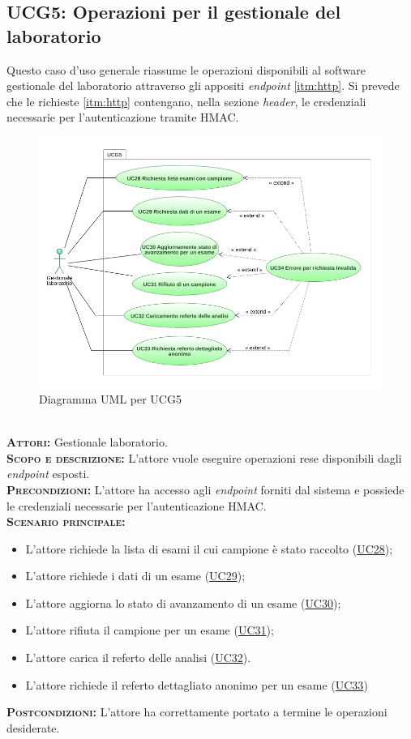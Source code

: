 \subsection{UCG5: Operazioni per il gestionale del laboratorio}
\label{sec:UCG5}
Questo caso d'uso generale riassume le operazioni disponibili al software gestionale del laboratorio attraverso gli appositi \textit{endpoint} \ref{itm:http}. Si prevede che le richieste \ref{itm:http} contengano, nella sezione \textit{header}, le credenziali necessarie per l'autenticazione tramite HMAC.
\begin{figure}[h!]
    \centering
    \includegraphics[width=\textwidth]{figures/uc/ucg5.png}
    \caption[Diagramma UML per UCG5]{Diagramma UML per UCG5
    \label{fig:ucg5}}
\end{figure}\\ 
\textsc{\textbf{Attori:}} Gestionale laboratorio.\\
\textsc{\textbf{Scopo e descrizione:}} L'attore vuole eseguire operazioni rese disponibili dagli \textit{endpoint} esposti.\\
\textsc{\textbf{Precondizioni:}} L'attore ha accesso agli \textit{endpoint} forniti dal sistema e possiede le credenziali necessarie per l'autenticazione HMAC.\\
\textsc{\textbf{Scenario principale:}} 
\begin{itemize}
    \item L'attore richiede la lista di esami il cui campione è stato raccolto (\hyperref[sec:UC28]{UC28});
    \item L'attore richiede i dati di un esame (\hyperref[sec:UC29]{UC29});
    \item L'attore aggiorna lo stato di avanzamento di un esame (\hyperref[sec:UC30]{UC30});
    \item L'attore rifiuta il campione per un esame (\hyperref[sec:UC31]{UC31});
    \item L'attore carica il referto delle analisi (\hyperref[sec:UC32]{UC32}).
    \item L'attore richiede il referto dettagliato anonimo per un esame (\hyperref[sec:UC33]{UC33})
\end{itemize}
\textsc{\textbf{Postcondizioni:}} L'attore ha correttamente portato a termine le operazioni desiderate.

